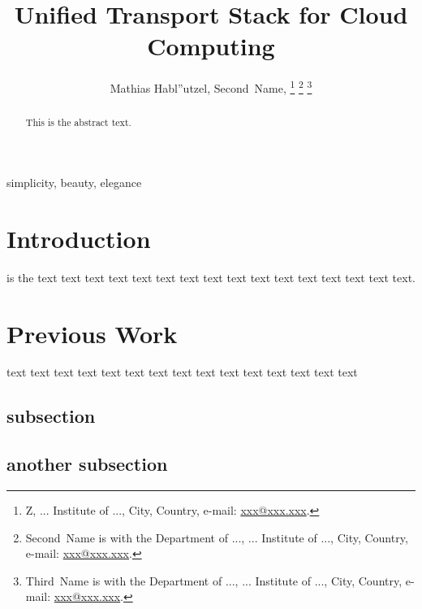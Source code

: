 \documentclass[twocolumn,english]{IEEEtran}
\theoremstyle{plain}
\theoremstyle{plain}
\begin{document}
\title{Unified Transport Stack for Cloud Computing}


\author{Mathias Habl''utzel, Second~Name,
\thanks{Z, ... Institute of ..., City,
Country, e-mail: \protect\href{http://xxx@xxx.xxx}{xxx@xxx.xxx}.%
}%
\thanks{Second~Name is with the Department of ..., ... Institute of ...,
City, Country, e-mail: \protect\href{http://xxx@xxx.xxx}{xxx@xxx.xxx}.%
}%
\thanks{Third~Name is with the Department of ..., ... Institute of ..., City,
Country, e-mail: \protect\href{http://xxx@xxx.xxx}{xxx@xxx.xxx}.%
}}








\maketitle
\begin{abstract}
This is the abstract text.\end{abstract}
\begin{IEEEkeywords}
simplicity, beauty, elegance
\end{IEEEkeywords}

\section{Introduction}



 is the text text text text text text text
text text text text text text text text text.


\section{Previous Work}

text text text text text text text text text text text text text text
text


\subsection{subsection}


\subsection{another subsection}
\end{document}
